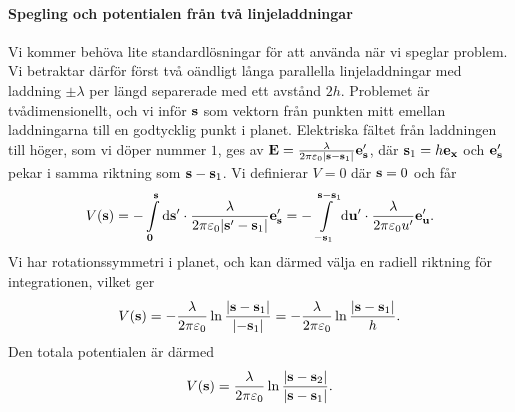 \paragraph{Spegling och potentialen från två linjeladdningar}
Vi kommer behöva lite standardlösningar för att använda när vi speglar problem. Vi betraktar därför först två oändligt långa parallella linjeladdningar med laddning $\pm\lambda$ per längd separerade med ett avstånd $2h$. Problemet är tvådimensionellt, och vi inför $\vb{s}$ som vektorn från punkten mitt emellan laddningarna till en godtycklig punkt i planet. Elektriska fältet från laddningen till höger, som vi döper nummer $1$, ges av $\vb{E} = \frac{\lambda}{2\pi\varepsilon_{0}\abs{\vb{s} - \vb{s}_{1}}}\vb{e}_{\vb{s}}'$, där $\vb{s}_{1} = h\vb{e}_{\vb{x}}$ och $\vb{e}_{\vb{s}}'$ pekar i samma riktning som $\vb{s} - \vb{s}_{1}$. Vi definierar $V = 0$ där $\vb{s} = 0$ och får
\begin{align*}
	V(\vb{s}) = -\int\limits_{\vb{0}}^{\vb{s}}\dd{\vb{s'}}\cdot \frac{\lambda}{2\pi\varepsilon_{0}\abs{\vb{s}' - \vb{s}_{1}}}\vb{e}_{\vb{s}}' = -\int\limits_{-\vb{s}_{1}}^{\vb{s} - \vb{s}_{1}}\dd{\vb{u'}}\cdot \frac{\lambda}{2\pi\varepsilon_{0}u'}\vb{e}_{\vb{u}}'.
\end{align*}
Vi har rotationssymmetri i planet, och kan därmed välja en radiell riktning för integrationen, vilket ger
\begin{align*}
	V(\vb{s}) = -\frac{\lambda}{2\pi\varepsilon_{0}}\ln{\frac{\abs{\vb{s} - \vb{s}_{1}}}{\abs{-\vb{s}_{1}}}} = -\frac{\lambda}{2\pi\varepsilon_{0}}\ln{\frac{\abs{\vb{s} - \vb{s}_{1}}}{h}}.
\end{align*}
Den totala potentialen är därmed
\begin{align*}
	V(\vb{s}) = \frac{\lambda}{2\pi\varepsilon_{0}}\ln{\frac{\abs{\vb{s} - \vb{s}_{2}}}{\abs{\vb{s} - \vb{s}_{1}}}}.
\end{align*}

